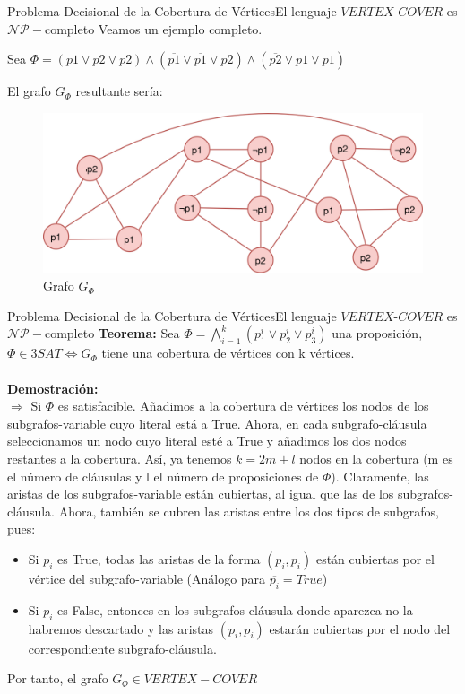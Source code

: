 \documentclass[10pt, envcountsect, presentation, aspectratio=169]{beamer}
\begin{document}
\begin{frame}{Problema Decisional de la Cobertura de Vértices}{El lenguaje $VERTEX\text{-}COVER$ es $\mathcal{NP}-$completo}
    \centering
    Veamos un ejemplo completo.

    Sea $\Phi = (p1 \vee p2 \vee p2) \wedge  (\overline{p1} \vee \overline{p1} \vee p2)\wedge  (\overline{p2} \vee p1 \vee p1)$

    El grafo $G_\Phi$ resultante sería:
    \begin{figure}
        \centering
        \includegraphics[width=0.65\linewidth]{images/T2_3_ejemploGrafo.png}
        \caption{Grafo $G_\Phi$}
        \label{fig:enter-label}
    \end{figure}
\end{frame}


\begin{frame}{Problema Decisional de la Cobertura de Vértices}{El lenguaje $VERTEX\text{-}COVER$ es $\mathcal{NP}-$completo}
    \textbf{Teorema:} Sea $\Phi=\bigwedge_{i=1}^k(p_1^i \vee p_2^i \vee p_3^i)$ una proposición, $\Phi \in 3SAT \Leftrightarrow G_\Phi$  tiene una cobertura de vértices con k vértices. \\~\\

    \textbf{Demostración:} \\
    $\boxed{\Rightarrow}$ Si $\Phi$ es satisfacible. Añadimos a la cobertura de vértices los nodos de los subgrafos-variable cuyo literal está a True. 
    Ahora, en cada subgrafo-cláusula seleccionamos un nodo cuyo literal esté a True y añadimos los dos nodos restantes a la cobertura. Así, ya tenemos $k = 2m + l$ nodos en la cobertura (m es el número de cláusulas y l el número de proposiciones de $\Phi$).
    Claramente, las aristas de los subgrafos-variable están cubiertas, al igual que las de los subgrafos-cláusula. Ahora, también se cubren las aristas entre los dos tipos de subgrafos, pues:
    \begin{itemize}
        \item Si $p_i$ es True, todas las aristas de la forma $(p_i,p_i)$ están cubiertas por el vértice del subgrafo-variable (Análogo para $\overline{p_i} = True$)
        \item Si $p_i$ es False, entonces en los subgrafos cláusula donde aparezca no la habremos descartado y las aristas $(p_i,p_i)$ estarán cubiertas por el nodo del correspondiente subgrafo-cláusula.
    \end{itemize}
    Por tanto, el grafo $G_\Phi \in VERTEX-COVER$
    
\end{frame}
\end{document}
